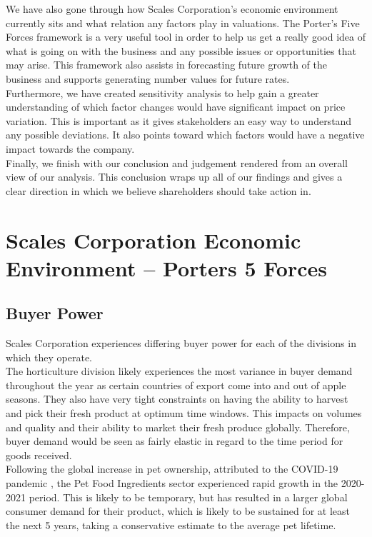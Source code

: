 \documentclass{article}
\begin{document}
We have also gone through how Scales Corporation’s economic environment currently sits and what relation any factors play in valuations. The Porter’s Five Forces framework is a very useful tool in order to help us get a really good idea of what is going on with the business and any possible issues or opportunities that may arise. This framework also assists in forecasting future growth of the business and supports generating number values for future rates.\\

Furthermore, we have created sensitivity analysis to help gain a greater understanding of which factor changes would have significant impact on price variation. This is important as it gives stakeholders an easy way to understand any possible deviations. It also points toward which factors would have a negative impact towards the company.\\

Finally, we finish with our conclusion and judgement rendered from an overall view of our analysis. This conclusion wraps up all of our findings and gives a clear direction in which we believe shareholders should take action in. 

\newpage
\section{Scales Corporation Economic Environment – Porters 5 Forces}
\subsection{Buyer Power}
Scales Corporation experiences differing buyer power for each of the divisions in which they operate. \\

The horticulture division likely experiences the most variance in buyer demand throughout the year as certain countries of export come into and out of apple seasons. They also have very tight constraints on having the ability to harvest and pick their fresh product at optimum time windows. This impacts on volumes and quality and their ability to market their fresh produce globally. Therefore, buyer demand would be seen as fairly elastic in regard to the time period for goods received. \\

Following the global increase in pet ownership, attributed to the COVID-19 pandemic \cite{petfood}, the Pet Food Ingredients sector experienced rapid growth in the 2020-2021 period. This is likely to be temporary, but has resulted in a larger global consumer demand for their product, which is likely to be sustained for at least the next 5 years, taking a conservative estimate to the average pet lifetime. 
\end{document}
